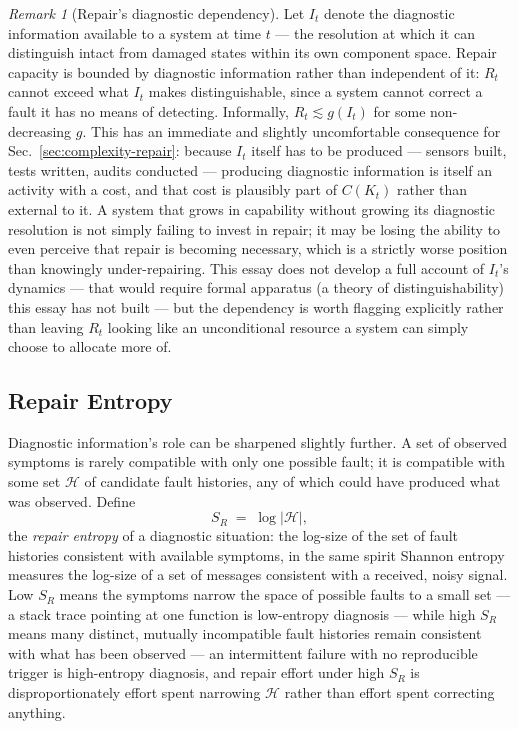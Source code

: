 \documentclass[11pt,a4paper]{article}
\theoremstyle{plain}
\theoremstyle{definition}
\theoremstyle{remark}
\newtheorem{remark}[theorem]{Remark}
\begin{document}
\begin{remark}[Repair's diagnostic dependency]
\label{rem:repair-information}
Let $I_t$ denote the diagnostic information available to a system at time $t$ — the resolution at which it can distinguish intact from damaged states within its own component space. Repair capacity is bounded by diagnostic information rather than independent of it: $R_t$ cannot exceed what $I_t$ makes distinguishable, since a system cannot correct a fault it has no means of detecting. Informally, $R_t \lesssim g(I_t)$ for some non-decreasing $g$. This has an immediate and slightly uncomfortable consequence for Sec.~\ref{sec:complexity-repair}: because $I_t$ itself has to be produced — sensors built, tests written, audits conducted — producing diagnostic information is itself an activity with a cost, and that cost is plausibly part of $C(K_t)$ rather than external to it. A system that grows in capability without growing its diagnostic resolution is not simply failing to invest in repair; it may be losing the ability to even perceive that repair is becoming necessary, which is a strictly worse position than knowingly under-repairing. This essay does not develop a full account of $I_t$'s dynamics — that would require formal apparatus (a theory of distinguishability) this essay has not built — but the dependency is worth flagging explicitly rather than leaving $R_t$ looking like an unconditional resource a system can simply choose to allocate more of.
\end{remark}

\subsection{Repair Entropy}
\label{subsec:repair-entropy}

Diagnostic information's role can be sharpened slightly further. A set of observed symptoms is rarely compatible with only one possible fault; it is compatible with some set $\mathcal{H}$ of candidate fault histories, any of which could have produced what was observed. Define
\[
S_R \;=\; \log|\mathcal{H}|,
\]
the \emph{repair entropy} of a diagnostic situation: the log-size of the set of fault histories consistent with available symptoms, in the same spirit Shannon entropy measures the log-size of a set of messages consistent with a received, noisy signal. Low $S_R$ means the symptoms narrow the space of possible faults to a small set — a stack trace pointing at one function is low-entropy diagnosis — while high $S_R$ means many distinct, mutually incompatible fault histories remain consistent with what has been observed — an intermittent failure with no reproducible trigger is high-entropy diagnosis, and repair effort under high $S_R$ is disproportionately effort spent narrowing $\mathcal{H}$ rather than effort spent correcting anything.
\end{document}
